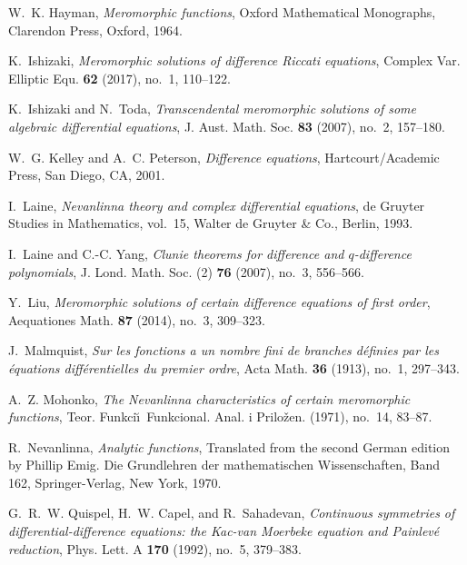 \documentclass{amsart}
\begin{document}
\begin{thebibliography}{10}
W.~K. Hayman, \emph{Meromorphic functions}, Oxford Mathematical Monographs,
  Clarendon Press, Oxford, 1964. 

K.~Ishizaki, \emph{Meromorphic solutions of difference {R}iccati equations},
  Complex Var. Elliptic Equ. \textbf{62} (2017), no.~1, 110--122. 

K.~Ishizaki and N.~Toda, \emph{Transcendental meromorphic solutions of some
  algebraic differential equations}, J. Aust. Math. Soc. \textbf{83} (2007),
  no.~2, 157--180. 

W.~G. Kelley and A.~C. Peterson, \emph{Difference equations},
  Hartcourt/Academic Press, San Diego, CA, 2001.

I.~Laine, \emph{Nevanlinna theory and complex differential equations}, de
  Gruyter Studies in Mathematics, vol.~15, Walter de Gruyter \& Co., Berlin,
  1993. 

I.~Laine and C.-C. Yang, \emph{Clunie theorems for difference and
  {$q$}-difference polynomials}, J. Lond. Math. Soc. (2) \textbf{76} (2007),
  no.~3, 556--566. 

Y.~Liu, \emph{Meromorphic solutions of certain difference equations of first
  order}, Aequationes Math. \textbf{87} (2014), no.~3, 309--323. 

J.~Malmquist, \emph{Sur les fonctions a un nombre fini de branches d\'efinies
  par les \'equations diff\'erentielles du premier ordre}, Acta Math.
  \textbf{36} (1913), no.~1, 297--343. 

A.~Z. Mohon{\cprime}ko, \emph{The {N}evanlinna characteristics of certain
  meromorphic functions}, Teor. Funkci\u\i\ Funkcional. Anal. i Prilo\v zen.
  (1971), no.~14, 83--87. 

R.~Nevanlinna, \emph{Analytic functions}, Translated from the second German
  edition by Phillip Emig. Die Grundlehren der mathematischen Wissenschaften,
  Band 162, Springer-Verlag, New York, 1970.

G.~R.~W. Quispel, H.~W. Capel, and R.~Sahadevan, \emph{Continuous symmetries of
  differential-difference equations: the {K}ac-van {M}oerbeke equation and
  {P}ainlev\'e reduction}, Phys. Lett. A \textbf{170} (1992), no.~5, 379--383.


\end{thebibliography}
\end{document}
